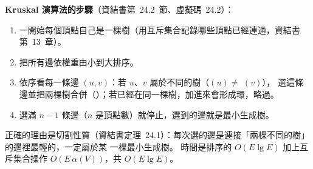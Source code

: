 \begin{pastsoln}
\textbf{Kruskal 演算法的步驟}（資結書第~24.2~節、虛擬碼~24.2）：
\begin{enumerate}
\item 一開始每個頂點自己是一棵樹（用互斥集合記錄哪些頂點已經連通，資結書第~13~章）。
\item 把所有邊依權重由小到大排序。
\item 依序看每一條邊 $(u, v)$：若 $u$、$v$ 屬於不同的樹（$(u) \ne$ $(v)$），
選這條邊並把兩棵樹合併（）；若已經在同一棵樹，加進來會形成環，略過。
\item 選滿 $n - 1$ 條邊（$n$ 是頂點數）就停止，選到的邊就是最小生成樹。
\end{enumerate}
正確的理由是切割性質（資結書定理~24.1）：每次選的邊是連接「兩棵不同的樹」的邊裡最輕的，一定屬於某
一棵最小生成樹。 時間是排序的 $O(E \lg E)$ 加上互斥集合操作 $O(E\,\alpha(V))$，共 $O(E \lg E)$。


\end{pastsoln}
